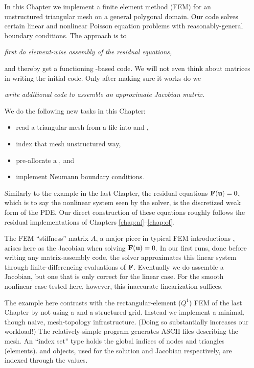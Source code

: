 
In this Chapter we implement a finite element method (FEM) for an unstructured triangular mesh on a general polygonal domain.  Our code solves certain linear and nonlinear Poisson equation problems with reasonably-general boundary conditions.  The approach is to
\begin{center}
\emph{first do element-wise assembly of the residual equations,}
\end{center}
and thereby get a functioning \pSNES-based code.  We will not even think about matrices in writing the initial code.  Only after making sure it works do we
\begin{center}
\emph{write additional code to assemble an approximate Jacobian matrix.}
\end{center}

We do the following new tasks in this Chapter:
\begin{itemize}
\item read a triangular mesh from a file into \PETSc \pVecs and \pISs,
\item index that mesh unstructured way,
\item pre-allocate a \PETSc \pMat, and
\item implement Neumann boundary conditions.
\end{itemize}

Similarly to the example in the last Chapter, the residual equations $\mathbf{F}(\mathbf{u})=0$, which is to say the nonlinear system seen by the \pSNES solver, is the discretized weak form of the PDE.  Our direct construction of these equations roughly follows the residual implementations of Chapters \ref{chap:nl}--\ref{chap:of}.

The FEM ``stiffness'' matrix $A$, a major piece in typical FEM introductions \citep{Braess2007,Elmanetal2005}, arises here as the Jacobian when solving $\mathbf{F}(\mathbf{u})=0$.  In our first runs, done before writing any matrix-assembly code, the \pSNES solver approximates this linear system through finite-differencing evaluations of $\mathbf{F}$.  Eventually we do assemble a Jacobian, but one that is only correct for the linear case.  For the smooth nonlinear case tested here, however, this inaccurate linearization suffices.

The example here contrasts with the rectangular-element ($Q^1$) FEM of the last Chapter by not using a \pDMDA and a structured grid.  Instead we implement a minimal, though naive, mesh-topology infrastructure.  (Doing so substantially increases our workload!)  The relatively-simple \Triangle program generates ASCII files describing the mesh.  An ``index set'' \pIS  type holds the global indices of nodes and triangles (elements).  \pVec and \pMat objects, used for the solution and Jacobian respectively, are indexed through the \pIS values.

